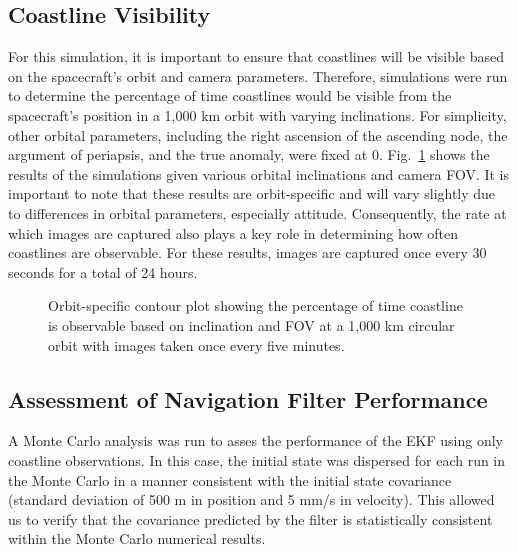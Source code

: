 \documentclass[]{aiaa-tc}%
\begin{document}
\subsection{Coastline Visibility}
For this simulation, it is important to ensure that coastlines will be visible based on the spacecraft's orbit and camera parameters.  Therefore, simulations were run to determine the percentage of time coastlines would be visible from the spacecraft's position in a 1,000 km orbit with varying inclinations.  For simplicity, other orbital parameters, including the right ascension of the ascending node, the argument of periapsis, and the true anomaly, were fixed at 0\degree.  Fig.~\ref{fig:contourplot} shows the results of the simulations given various orbital inclinations and camera FOV.  It is important to note that these results are orbit-specific and will vary slightly due to differences in orbital parameters, especially attitude. Consequently, the rate at which images are captured also plays a key role in determining how often coastlines are observable.  For these results, images are captured once every 30 seconds for a total of 24 hours.
\begin{figure}[h!]
\centering
{} %
\caption{Orbit-specific contour plot showing the percentage of time coastline is observable based on inclination and FOV at a 1,000 km circular orbit with images taken once every five minutes.}
\label{fig:contourplot}
\end{figure}

\subsection{Assessment of Navigation Filter Performance}
A Monte Carlo analysis was run to asses the performance of the EKF using only coastline observations.  In this case, the initial state was dispersed for each run in the Monte Carlo in a manner consistent with the initial state covariance (standard deviation of 500 m in position and 5 mm/s in velocity).  This allowed us to verify that the covariance predicted by the filter is statistically consistent within the Monte Carlo numerical results.  
\end{document}
